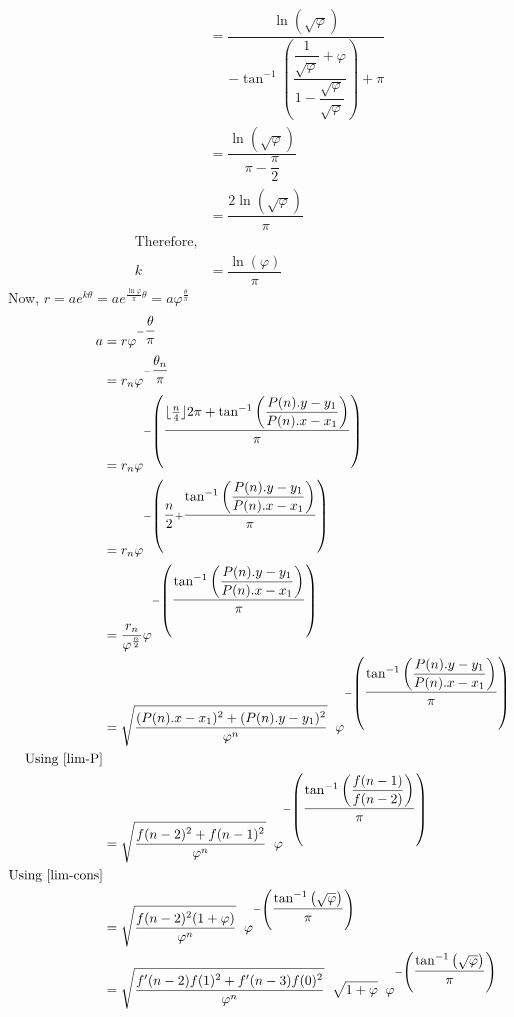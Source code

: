 \documentclass{article}
\begin{document}
\begin{align*}
	&= \dfrac{\ln{\left(\sqrt{\varphi}\right)}}
	{-\tan^{-1}\left({\dfrac{\dfrac{1}{\sqrt{\varphi}}+\varphi}{1 - \dfrac{\sqrt{\varphi}}{\sqrt{\varphi}}}}\right) + \pi}\\
	&= \dfrac{\ln{\left(\sqrt{\varphi}\right)}}{\pi - \dfrac{\pi}{2}}\\
	&= \dfrac{2\ln{\left(\sqrt{\varphi}\right)}}{\pi}\\
	\text{Therefore,}\\
	k &= \dfrac{\ln{\left(\varphi\right)}}{\pi}
\end{align*}
Now, 
	{\large$r = ae^{k\theta} = 
		ae^{\frac{\ln{\varphi}}{\pi}\theta} = a\varphi^{\frac{\theta}{\pi}}$}
\begin{align*}
	a &= r\varphi^{-\dfrac{\theta}{\pi}}\\
	&= r_n\varphi^{-\dfrac{\theta_n}{\pi}}\\
	&= r_n\varphi^{-\left(\dfrac{\lfloor\frac{n}{4}\rfloor2\pi + \tan^{-1}{\left(\dfrac{P(n).y-y_1}{P(n).x - x_1}\right)}}{\pi}\right)}\\
	&= r_n\varphi^{-\left(\dfrac{n}{2} + \dfrac{ \tan^{-1}{\left(\dfrac{P(n).y-y_1}{P(n).x - x_1}\right)}}{\pi}\right)}\\
	&= \dfrac{r_n}{\varphi^{\frac{n}{2}}}\varphi^{-\left(\dfrac{ \tan^{-1}{\left(\dfrac{P(n).y-y_1}{P(n).x - x_1}\right)}}{\pi}\right)}\\
	&= \sqrt{\dfrac{(P(n).x-x_1)^2 + (P(n).y-y_1)^2}{\varphi^n}}\hspace{2mm}\varphi^{-\left(\dfrac{ \tan^{-1}{\left(\dfrac{P(n).y-y_1}{P(n).x - x_1}\right)}}{\pi}\right)}\\
	\text{Using \ref{lim-P}}\\
	&= \sqrt{\dfrac{f(n-2)^2 + f(n-1)^2}{\varphi^n}}\hspace{2mm}\varphi^{-\left(\dfrac{ \tan^{-1}{\left(\dfrac{f(n-1)}{f(n-2)}\right)}}{\pi}\right)}\\
	\text{Using \ref{lim-cons}}\\
	&= \sqrt{\dfrac{f(n-2)^2 (1 + \varphi)}{\varphi^n}}\hspace{2mm}\varphi^{-\left(\dfrac{ \tan^{-1}{\left(\sqrt{\varphi}\right)}}{\pi}\right)}\\
	&= \sqrt{\dfrac{f'(n-2)f(1)^2+f'(n-3)f(0)^2}{\varphi^n}}\hspace{2mm}\sqrt{1+\varphi}\hspace{2mm}\varphi^{-\left(\dfrac{ \tan^{-1}{\left(\sqrt{\varphi}\right)}}{\pi}\right)}
\end{align*}
\end{document}
